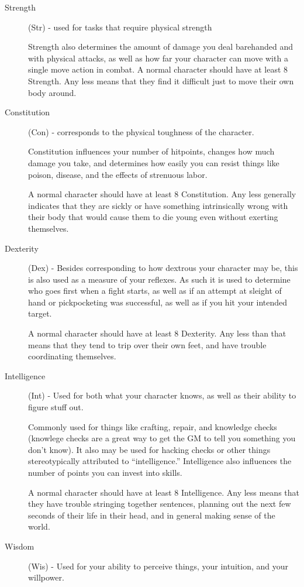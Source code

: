 \begin{description}
\item[Strength] (Str) - used for tasks that require physical strength

Strength also determines the amount of damage you deal barehanded and with physical attacks, as well as how far your character can move with a single move action in combat. A normal character should have at least 8 Strength. Any less means that they find it difficult just to move their own body around.
\item[Constitution] (Con) - corresponds to the physical toughness of the character.

Constitution influences your number of hitpoints, changes how much damage you take, and determines how easily you can resist things like poison, disease, and the effects of strenuous labor.

A normal character should have at least 8 Constitution. Any less generally indicates that they are sickly or have something intrinsically wrong with their body that would cause them to die young even without exerting themselves.
\item[Dexterity] (Dex) - Besides corresponding to how dextrous your character may be, this is also used as a measure of your reflexes. As such it is used to determine who goes first when a fight starts, as well as if an attempt at sleight of hand or pickpocketing was successful, as well as if you hit your intended target.

A normal character should have at least 8 Dexterity. Any less than that means that they tend to trip over their own feet, and have trouble coordinating themselves.
\item [Intelligence] (Int) - Used for both what your character knows, as well as their ability to figure stuff out.

Commonly used for things like crafting, repair, and knowledge checks (knowlege checks are a great way to get the GM to tell you something you don't know). It also may be used for hacking checks or other things stereotypically attributed to “intelligence.” Intelligence also influences the number of points you can invest into skills.

A normal character should have at least 8 Intelligence. Any less means that they have trouble stringing together sentences, planning out the next few seconds of their life in their head, and in general making sense of the world.
\item[Wisdom] (Wis) - Used for your ability to perceive things, your intuition, and your willpower.


\end{description}
